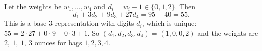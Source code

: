 Let the weights be $w_1,\dots,w_4$ and $d_i=w_i-1\in\{0,1,2\}$. Then
\[d_1+3d_2+9d_3+27d_4=95-40=55.\]
This is a base-$3$ representation with digits $d_i$, which is unique: $55=2\cdot27+0\cdot9+0\cdot3+1$. So $(d_1,d_2,d_3,d_4)=(1,0,0,2)$ and the weights are $\boxed{2,\ 1,\ 1,\ 3}$ ounces for bags $1,2,3,4$.
